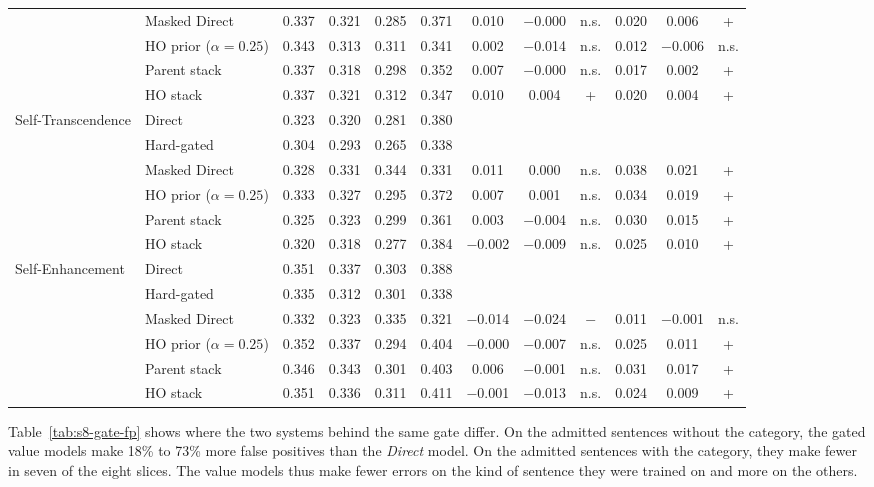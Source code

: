 {{\begin{longtable}{llcccccccccc}
 & Masked Direct & 0.337 & 0.321 & 0.285 & 0.371 & 0.010 & $-$0.000 & n.s. & 0.020 & 0.006 & + \\
 & HO prior ($\alpha=0.25$) & 0.343 & 0.313 & 0.311 & 0.341 & 0.002 & $-$0.014 & n.s. & 0.012 & $-$0.006 & n.s. \\
 & Parent stack & 0.337 & 0.318 & 0.298 & 0.352 & 0.007 & $-$0.000 & n.s. & 0.017 & 0.002 & + \\
 & HO stack & 0.337 & 0.321 & 0.312 & 0.347 & 0.010 & 0.004 & + & 0.020 & 0.004 & + \\
Self-Transcendence & Direct & 0.323 & 0.320 & 0.281 & 0.380 &  &  &  &  &  &  \\
 & Hard-gated & 0.304 & 0.293 & 0.265 & 0.338 &  &  &  &  &  &  \\
 & Masked Direct & 0.328 & 0.331 & 0.344 & 0.331 & 0.011 & 0.000 & n.s. & 0.038 & 0.021 & + \\
 & HO prior ($\alpha=0.25$) & 0.333 & 0.327 & 0.295 & 0.372 & 0.007 & 0.001 & n.s. & 0.034 & 0.019 & + \\
 & Parent stack & 0.325 & 0.323 & 0.299 & 0.361 & 0.003 & $-$0.004 & n.s. & 0.030 & 0.015 & + \\
 & HO stack & 0.320 & 0.318 & 0.277 & 0.384 & $-$0.002 & $-$0.009 & n.s. & 0.025 & 0.010 & + \\
Self-Enhancement & Direct & 0.351 & 0.337 & 0.303 & 0.388 &  &  &  &  &  &  \\
 & Hard-gated & 0.335 & 0.312 & 0.301 & 0.338 &  &  &  &  &  &  \\
 & Masked Direct & 0.332 & 0.323 & 0.335 & 0.321 & $-$0.014 & $-$0.024 & $-$ & 0.011 & $-$0.001 & n.s. \\
 & HO prior ($\alpha=0.25$) & 0.352 & 0.337 & 0.294 & 0.404 & $-$0.000 & $-$0.007 & n.s. & 0.025 & 0.011 & + \\
 & Parent stack & 0.346 & 0.343 & 0.301 & 0.403 & 0.006 & $-$0.001 & n.s. & 0.031 & 0.017 & + \\
 & HO stack & 0.351 & 0.336 & 0.311 & 0.411 & $-$0.001 & $-$0.013 & n.s. & 0.024 & 0.009 & + \\
\end{longtable}
}
}


Table~\ref{tab:s8-gate-fp} shows where the two systems behind the same gate differ. On the admitted sentences without the category, the gated value models make 18\% to 73\% more false positives than the \emph{Direct} model. On the admitted sentences with the category, they make fewer in seven of the eight slices. The value models thus make fewer errors on the kind of sentence they were trained on and more on the others.

